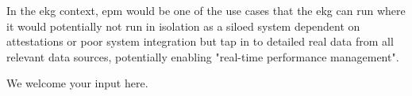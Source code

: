 %
%

\ekgmmContextSection

In the \gls{ekg} context, \gls{epm} would be one of the use cases that the \gls{ekg} can run where it would potentially
not run in isolation as a siloed system dependent on attestations or poor system integration but tap in to detailed
real data from all relevant data sources, potentially enabling "real-time performance management".


We welcome your input here.

